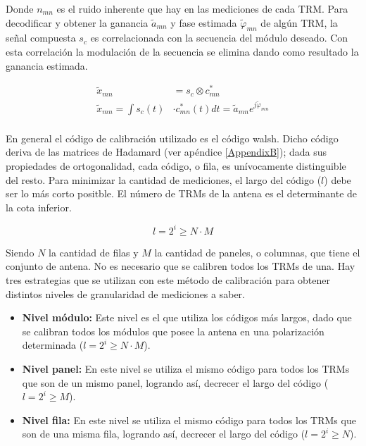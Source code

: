 Donde $n_{mn}$ es el ruido inherente que hay en las mediciones de cada TRM. Para decodificar y obtener la ganancia
$\tilde{a}_{mn}$ y fase estimada $\tilde\varphi_{mn}$ de algún TRM, la señal compuesta $s_c$ es correlacionada con
la secuencia del módulo deseado. Con esta correlación la modulación de la secuencia se elimina dando como resultado
la ganancia estimada.

\begin{equation}
\begin{aligned}
	\tilde{x}_{mn} &= s_c \otimes c^*_{mn} \\
	\tilde{x}_{mn} = \int s_c(t) &\cdot c^*_{mn}(t) dt = \tilde{a}_{mn}e^{j\tilde{\varphi}_{mn}} \\
\end{aligned}
\label{eq:classic_correlation}
\end{equation}

En general el código de calibración utilizado es el código walsh. Dicho código deriva de las matrices de Hadamard (ver
apéndice \ref{AppendixB}); dada sus propiedades de ortogonalidad, cada código, o fila, es unívocamente distinguible del
resto. Para minimizar la cantidad de mediciones, el largo del código ($l$) debe ser lo más corto positble. El número de
TRMs de la antena es el determinante de la cota inferior.

\begin{equation}
	l = 2^i \ge N \cdot M
\end{equation}

Siendo $N$ la cantidad de filas y $M$ la cantidad de paneles, o columnas, que tiene el conjunto de antena. No es necesario que
se calibren todos los TRMs de una. Hay tres estrategias que se utilizan con este método de calibración para obtener
distintos niveles de granularidad de mediciones a saber.

\begin{itemize}
	\item \textbf{Nivel módulo:} Este nivel es el que utiliza los códigos más largos, dado que se calibran todos los módulos que
		posee la antena en una polarización determinada ($l = 2^i \ge N \cdot M$).
	\item \textbf{Nivel panel:} En este nivel se utiliza el mismo código para todos los TRMs que son de un mismo panel,
		logrando así, decrecer el largo del código ($l = 2^i \ge M$).
	\item \textbf{Nivel fila:} En este nivel se utiliza el mismo código para todos los TRMs que son de una misma fila,
		logrando así, decrecer el largo del código ($l = 2^i \ge N$).
\end{itemize}

